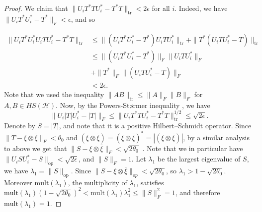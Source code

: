 \documentclass[11pt]{amsart}
\DeclareMathOperator{\tr}{tr}
\DeclareMathOperator{\op}{op}
\newcommand{\cH}{{\mathcal{H}}}
\theoremstyle{definition}
\theoremstyle{remark}
\theoremstyle{definition}
\newcommand{\ad}[1]{\begingroup\color{orange}Alon: #1\endgroup}
\newcommand{\iti}[1]{{\begingroup\color{blue}Itamar: #1\endgroup}}
\begin{document}
   \begin{proof}
       We claim that $\| U_i T^*TU_i^* - T^*T \|_{\tr}< 2\epsilon$ for all $i$. Indeed, we have $\| U_iT^*U_i^* - T^* \|_{F}  < \epsilon$, and so
   
   \begin{align*}
       \|U_i T^*U_i^*U_iT U_i^* - T^*T \|_{\tr} &\leq \| (U_i T^* U_i^* - T^*) U_i T U_i^* \|_{\tr} + \| T^*(U_iTU_i^* - T) \|_{\tr}\\
       &\leq \| (U_i T^* U_i^* - T^*) \|_F\| U_i T U_i^* \|_F\\
       &+ \| T^* \|_F \|(U_iTU_i^* - T) \|_{F} \\
       &< 2\epsilon.
   \end{align*}
       Note that we used the inequality $\|A B\|_{\tr} \leq \|A \|_F\|B\|_F$ for $A,B \in HS(\cH)$. 
       Now, by the Powers-Størmer inequality \cite[Proposition 6.2.4]{BO}, we have
       $$ \| U_i |T|U_i^* - |T| \|_F \leq \| U_i T^*T U_i^* - T^*T\|_{\tr}^{1/2} \leq \sqrt{2\epsilon}.$$
       Denote by $S = |T|$, and note that it is a positive Hilbert--Schmidt operator. Since $\| T -\xi \otimes \bar\xi \|_{F} < \theta_0$ and $(\xi \otimes \bar \xi) = (\xi \otimes \bar \xi)^* = |(\xi \otimes \bar \xi)|$, by a similar analysis to above we get that $\|S - \xi \otimes \bar{\xi} \|_F < \sqrt{2\theta_0}$ . 
       Note that we in particular have $\| U_i S U_i^* - S \|_{\op} < \sqrt{2\epsilon}$,  and $\| S \|_F = 1$.
       Let $\lambda_1$ be the largest eigenvalue of $S$, we have $\lambda_1 = \| S \|_{\op}$. Since $\| S - \xi \otimes \bar\xi \|_{op}  < \sqrt{2\theta_0}$, so $ \lambda_1 > 1 - \sqrt{2\theta_0}$. 
       Moreover $\mathrm{mult}(\lambda_1)$, the multiplicity of  $\lambda_1$, satisfies $\mathrm{mult}(\lambda_1) (1- \sqrt{2\theta_0})^2< \mathrm{mult}(\lambda_1) \lambda_1^2\leq \| S \|_F^2 = 1$, and therefore $\mathrm{mult}(\lambda_1)=1$.


\end{proof}
\end{document}
